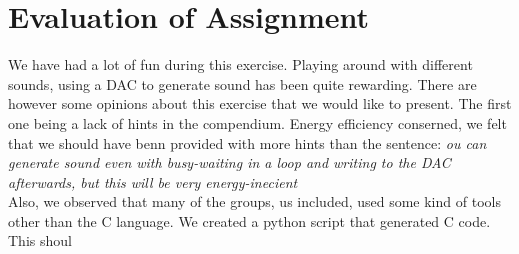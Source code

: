 \section{Evaluation of Assignment}
We have had a lot of fun during this exercise. Playing around with different sounds, using a DAC to generate sound has been quite rewarding. There are however some opinions about this exercise that we would like to present. The first one being a lack of hints in the compendium. Energy efficiency conserned, we felt that we should have benn provided with more hints than the sentence:
\emph{ou can generate sound even with busy-waiting in a loop and writing to the DAC afterwards, but this will be very energy-inecient}\\
Also, we observed that many of the groups, us included, used some kind of tools other than the C language. We created a python script that generated C code. This shoul
